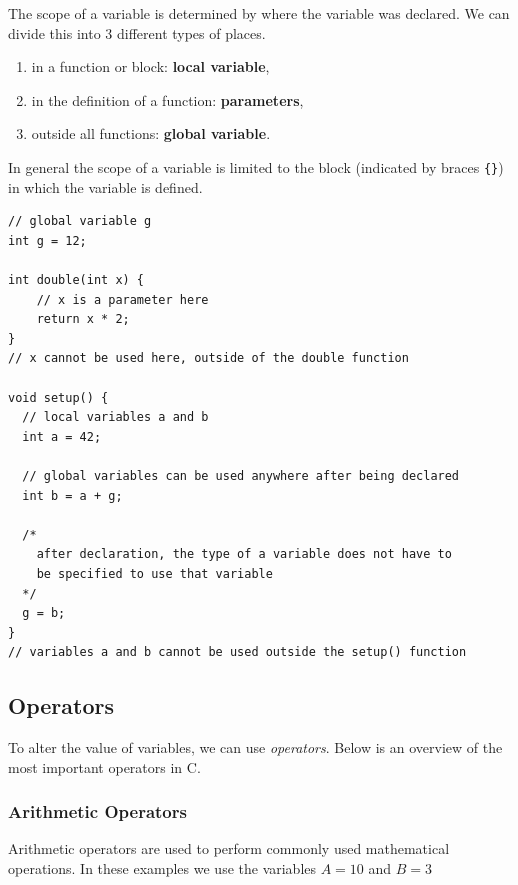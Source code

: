 \documentclass[11pt,fleqn]{book} %
\def\Cpp{{C\nolinebreak[4]\hspace{-.05em}\raisebox{.4ex}{\tiny\bf ++}}}
\begin{document}
\noindent
The scope of a variable is determined by where the variable was declared. We can divide this into 3 different types of places.\\

\begin{enumerate}
	\item in a function or block: \textbf{local variable},
	\item in the definition of a function: \textbf{parameters},
	\item outside all functions: \textbf{global variable}.
\end{enumerate}

\noindent
In general the scope of a variable is limited to the block (indicated by braces \texttt {\{\}}) in which the variable is defined.

\begin{example}
	\phantom{ }
	\begin{verbatim}
// global variable g
int g = 12;

int double(int x) {
	// x is a parameter here
	return x * 2;
}
// x cannot be used here, outside of the double function

void setup() {
  // local variables a and b
  int a = 42;

  // global variables can be used anywhere after being declared
  int b = a + g;

  /*
    after declaration, the type of a variable does not have to
    be specified to use that variable
  */
  g = b;
}
// variables a and b cannot be used outside the setup() function
	\end{verbatim}
\end{example}

\subsection{Operators}
To alter the value of variables, we can use \emph{operators}. Below is an overview of the most important operators in \Cpp.

\subsubsection{Arithmetic Operators}

Arithmetic operators are used to perform commonly used mathematical operations.
In these examples we use the variables $ A = 10 $ and $ B = 3 $
\end{document}
